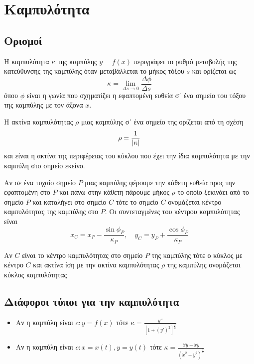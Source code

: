 



\everymath{\displaystyle}





\chapter{Καμπυλότητα}

\section{Ορισμοί}


\begin{dfn}
  Η \textcolor{Col2}{καμπυλότητα $\kappa$} της καμπύλης $ y = f(x) $ περιγράφει
  το ρυθμό μεταβολής της κατεύθυνσης της καμπύλης όταν μεταβάλλεται το μήκος
  τόξου $s$ και ορίζεται ως 
  \[
    \kappa = \lim_{\Delta s\to 0} \frac{\Delta \phi}{\Delta s} 
  \] 
  όπου $\phi$ είναι η γωνία που σχηματίζει η εφαπτομένη ευθεία σ᾽ ένα σημείο
  του τόξου της καμπύλης με τον άξονα $x$. 
\end{dfn}

\begin{dfn}
  Η \textcolor{Col2}{ακτίνα καμπυλότητας $\rho$} μιας καμπύλης σ᾽ ένα σημείο
  της ορίζεται από τη σχέση 
  \[
    \rho = \frac{1}{\abs{\kappa}} 
  \] 
  και είναι η ακτίνα της περιφέρειας του κύκλου που έχει την ίδια καμπυλότητα
  με την καμπύλη στο σημείο εκείνο.
\end{dfn}

\begin{dfn}
  Αν σε ένα τυχαίο σημείο $P$ μιας καμπύλης φέρουμε την κάθετη ευθεία  προς την
  εφαπτομένη στο $P$ και πάνω στην κάθετη πάρουμε μήκος $\rho$ το οποίο
  ξεκινάει από το σημείο $P$ και καταλήγει στο σημείο $C$ τότε το σημείο $C$
  ονομάζεται \textcolor{Col2}{κέντρο καμπυλότητας} της καμπύλης στο $P$.
  Οι συντεταγμένες του κέντρου καμπυλότητας είναι
  \[
    x_{C} = x_{P} - \frac{\sin{\phi_{P}}}{\kappa_{P}}, \quad y_{C} = y_{P} +
    \frac{\cos{\phi_{P}}}{\kappa_{P}} 
  \] 
\end{dfn}

\begin{dfn}
  Αν $C$ είναι το κέντρο καμπυλότητας στο σημείο $P$ της καμπύλης τότε ο
  κύκλος με κέντρο $C$ και ακτίνα ίση με την ακτίνα καμπυλότητας $\rho$ της
  καμπύλης ονομάζεται \textcolor{Col2}{κύκλος καμπυλότητας}
\end{dfn}

\section{Διάφοροι τύποι για την καμπυλότητα}

\begin{itemize}
  \item Αν η καμπύλη είναι $c: y = f(x) $ τότε $ \kappa = \frac{y''}{[1 +
    (y')^{2}]^{\frac{3}{2}}} $
  \item Αν η καμπύλη είναι $ c: x = x(t), y = y(t) $ τότε $ \kappa =
    \frac{\dot{x}\ddot{y} - \ddot{x}\dot{y}}{(\dot{x}^{2} +
    \dot{y}^{2})^{\frac{3}{2}}}$
\end{itemize}




